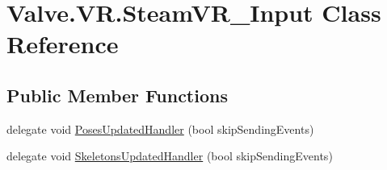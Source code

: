 \hypertarget{class_valve_1_1_v_r_1_1_steam_v_r___input}{}\section{Valve.\+V\+R.\+Steam\+V\+R\+\_\+\+Input Class Reference}
\label{class_valve_1_1_v_r_1_1_steam_v_r___input}
\subsection*{Public Member Functions}
\begin{DoxyCompactItemize}
\item 
delegate void \mbox{\hyperlink{class_valve_1_1_v_r_1_1_steam_v_r___input_acfd43d7f2d9763ec0aff8e11dfdcf15d}{Poses\+Updated\+Handler}} (bool skip\+Sending\+Events)
\item 
delegate void \mbox{\hyperlink{class_valve_1_1_v_r_1_1_steam_v_r___input_a1880748ba2acc071a2a1e6eaa2ca2fd5}{Skeletons\+Updated\+Handler}} (bool skip\+Sending\+Events)
\end{DoxyCompactItemize}
